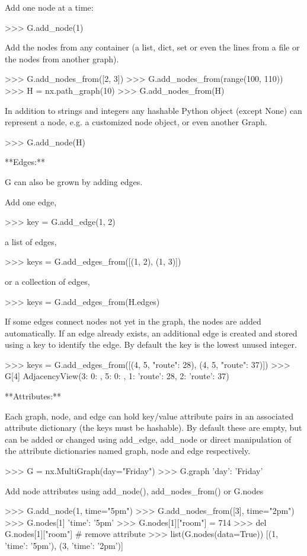 \begin{DoxyVerb}
Add one node at a time:

>>> G.add_node(1)

Add the nodes from any container (a list, dict, set or
even the lines from a file or the nodes from another graph).

>>> G.add_nodes_from([2, 3])
>>> G.add_nodes_from(range(100, 110))
>>> H = nx.path_graph(10)
>>> G.add_nodes_from(H)

In addition to strings and integers any hashable Python object
(except None) can represent a node, e.g. a customized node object,
or even another Graph.

>>> G.add_node(H)

**Edges:**

G can also be grown by adding edges.

Add one edge,

>>> key = G.add_edge(1, 2)

a list of edges,

>>> keys = G.add_edges_from([(1, 2), (1, 3)])

or a collection of edges,

>>> keys = G.add_edges_from(H.edges)

If some edges connect nodes not yet in the graph, the nodes
are added automatically.  If an edge already exists, an additional
edge is created and stored using a key to identify the edge.
By default the key is the lowest unused integer.

>>> keys = G.add_edges_from([(4, 5, {"route": 28}), (4, 5, {"route": 37})])
>>> G[4]
AdjacencyView({3: {0: {}}, 5: {0: {}, 1: {'route': 28}, 2: {'route': 37}}})

**Attributes:**

Each graph, node, and edge can hold key/value attribute pairs
in an associated attribute dictionary (the keys must be hashable).
By default these are empty, but can be added or changed using
add_edge, add_node or direct manipulation of the attribute
dictionaries named graph, node and edge respectively.

>>> G = nx.MultiGraph(day="Friday")
>>> G.graph
{'day': 'Friday'}

Add node attributes using add_node(), add_nodes_from() or G.nodes

>>> G.add_node(1, time="5pm")
>>> G.add_nodes_from([3], time="2pm")
>>> G.nodes[1]
{'time': '5pm'}
>>> G.nodes[1]["room"] = 714
>>> del G.nodes[1]["room"]  # remove attribute
>>> list(G.nodes(data=True))
[(1, {'time': '5pm'}), (3, {'time': '2pm'})]


\end{DoxyVerb}
